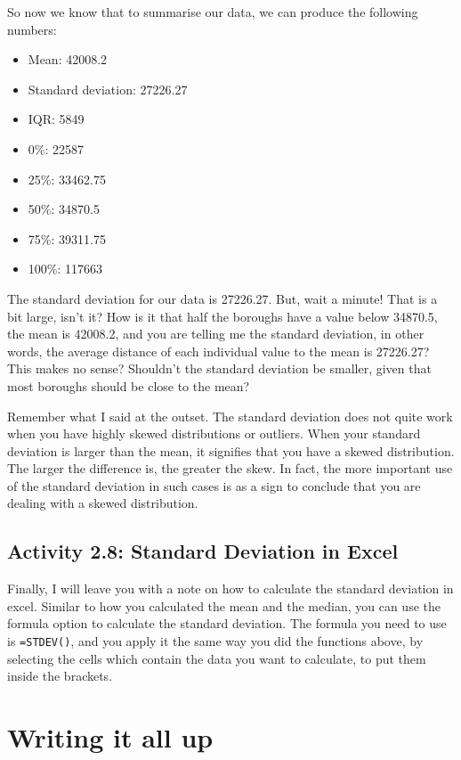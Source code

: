 \documentclass[
]{book}
\providecommand{\tightlist}{%
  \setlength{\itemsep}{0pt}\setlength{\parskip}{0pt}}
\begin{document}
So now we know that to summarise our data, we can produce the following numbers:

\begin{itemize}
\tightlist
\item
  Mean: 42008.2
\item
  Standard deviation: 27226.27
\item
  IQR: 5849
\item
  0\%: 22587
\item
  25\%: 33462.75
\item
  50\%: 34870.5
\item
  75\%: 39311.75
\item
  100\%: 117663
\end{itemize}

The standard deviation for our data is 27226.27. But, wait a minute! That is a bit large, isn't it? How is it that half the boroughs have a value below 34870.5, the mean is 42008.2, and you are telling me the standard deviation, in other words, the average distance of each individual value to the mean is 27226.27? This makes no sense? Shouldn't the standard deviation be smaller, given that most boroughs should be close to the mean?

Remember what I said at the outset. The standard deviation does not quite work when you have highly skewed distributions or outliers. When your standard deviation is larger than the mean, it signifies that you have a skewed distribution. The larger the difference is, the greater the skew. In fact, the more important use of the standard deviation in such cases is as a sign to conclude that you are dealing with a skewed distribution.

\hypertarget{activity-2.8-standard-deviation-in-excel}{%
\subsection{Activity 2.8: Standard Deviation in Excel}\label{activity-2.8-standard-deviation-in-excel}}

Finally, I will leave you with a note on how to calculate the standard deviation in excel. Similar to how you calculated the mean and the median, you can use the formula option to calculate the standard deviation. The formula you need to use is \texttt{=STDEV()}, and you apply it the same way you did the functions above, by selecting the cells which contain the data you want to calculate, to put them inside the brackets.

\hypertarget{writing-it-all-up}{%
\section{Writing it all up}\label{writing-it-all-up}}
\end{document}
